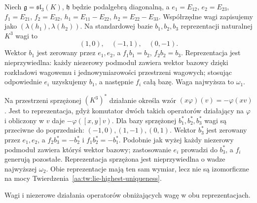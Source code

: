 \begin{przyklad}
\label{aa:prz:lie-highest-sl3}
Niech $\mathfrak g=\mathfrak{sl}_3(K)$, $\mathfrak h$ będzie podalgebrą diagonalną, a $e_1=E_{12}$, $e_2=E_{23}$, $f_1=E_{21}$, $f_2=E_{32}$, $h_1=E_{11}-E_{22}$, $h_2=E_{22}-E_{33}$. Współrzędne wagi zapisujemy jako $(\lambda(h_1),\lambda(h_2))$. Na standardowej bazie $b_1,b_2,b_3$ reprezentacji naturalnej $K^3$ wagi to
\[
 (1,0),\quad (-1,1),\quad (0,-1).
\]
Wektor $b_1$ jest zerowany przez $e_1,e_2$, a $f_1b_1=b_2$, $f_2b_2=b_3$. Reprezentacja jest nieprzywiedlna: każdy niezerowy podmoduł zawiera wektor bazowy dzięki rozkładowi wagowemu i jednowymiarowości przestrzeni wagowych; stosując odpowiednie $e_i$ uzyskujemy $b_1$, a następnie $f_i$ całą bazę. Waga najwyższa to $\omega_1$.

Na przestrzeni sprzężonej $(K^3)^*$ działanie określa wzór $(x\varphi)(v)=-\varphi(xv)$. Jest to reprezentacja, gdyż komutator dwóch takich operatorów działający na $\varphi$ i obliczony w $v$ daje $-\varphi([x,y]v)$. Dla bazy sprzężonej $b_1^*,b_2^*,b_3^*$ wagi są przeciwne do poprzednich:
$(-1,0),(1,-1),(0,1)$. Wektor $b_3^*$ jest zerowany przez $e_1,e_2$, a $f_2b_3^*=-b_2^*$ i $f_1b_2^*=-b_1^*$. Podobnie jak wyżej każdy niezerowy podmoduł zawiera któryś wektor bazowy; zastosowanie $e_i$ prowadzi do $b_3^*$, a $f_i$ generują pozostałe. Reprezentacja sprzężona jest nieprzywiedlna o wadze najwyższej $\omega_2$. Obie reprezentacje mają ten sam wymiar, lecz nie są izomorficzne na mocy Twierdzenia~\ref{aa:tw:lie-highest-uniqueness}.
\end{przyklad}

\begin{center}

\small Wagi i niezerowe działania operatorów obniżających wagę w obu reprezentacjach.
\end{center}
